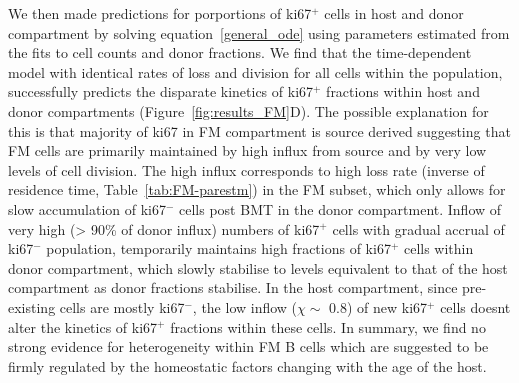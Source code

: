\documentclass[11.5pt]{article}
\begin{document}
We then made predictions for porportions of ki67$^+$ cells in host and donor compartment by solving equation~\ref{general_ode} using parameters estimated from the fits to cell counts and donor fractions.
We find that the time-dependent model with identical rates of loss and division for all cells within the population, successfully predicts the disparate kinetics of ki67$^+$ fractions within host and donor compartments (Figure~\ref{fig:results_FM}D).
The possible explanation for this is that majority of ki67 in FM compartment is source derived suggesting that FM cells are primarily maintained by high influx from source and by very low levels of cell division.
The high influx corresponds to high loss rate (inverse of residence time, Table~\ref{tab:FM-parestm}) in the FM subset, which only allows for slow accumulation of ki67$^-$ cells post BMT in the donor compartment. 
Inflow of very high (> 90\% of donor influx) numbers of ki67$^+$ cells with gradual accrual of ki67$^-$ population, temporarily maintains high fractions of ki67$^+$ cells within donor compartment, which slowly stabilise to levels equivalent to that of the host compartment as donor fractions stabilise.
In the host compartment, since pre-existing cells are mostly ki67$^-$, the low inflow ($\chi \sim$ 0.8)  of new ki67$^+$ cells doesnt alter the kinetics of ki67$^+$ fractions within these cells.
In summary, we find no strong evidence for heterogeneity within FM B cells which are suggested to be firmly regulated by the homeostatic factors changing with the age of the host.
\end{document}
